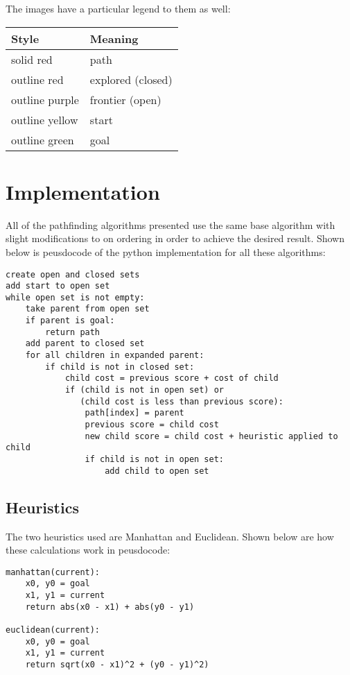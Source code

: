 \documentclass[11pt,letterpaper]{article}
\begin{document}
The images have a particular legend to them as well: \\
\begin{center}
\begin{tabular}{l | l}
Style & Meaning \\ \hline
solid red & path \\
outline red & explored (closed) \\
outline purple & frontier (open) \\
outline yellow & start \\
outline green & goal \\
\end{tabular}
\end{center}

\clearpage

\section{Implementation}
All of the pathfinding algorithms presented use the same base algorithm with slight modifications to on ordering in order to achieve the desired result.
Shown below is peusdocode of the python implementation for all these algorithms:

\begin{verbatim}
create open and closed sets
add start to open set
while open set is not empty:
    take parent from open set
    if parent is goal:
        return path
    add parent to closed set
    for all children in expanded parent:
        if child is not in closed set:
            child cost = previous score + cost of child
            if (child is not in open set) or
               (child cost is less than previous score):
                path[index] = parent
                previous score = child cost
                new child score = child cost + heuristic applied to child
                if child is not in open set:
                    add child to open set
\end{verbatim}

\subsection{Heuristics}

The two heuristics used are Manhattan and Euclidean.
Shown below are how these calculations work in peusdocode:

\begin{verbatim}
manhattan(current):
    x0, y0 = goal
    x1, y1 = current
    return abs(x0 - x1) + abs(y0 - y1)

euclidean(current):
    x0, y0 = goal
    x1, y1 = current
    return sqrt(x0 - x1)^2 + (y0 - y1)^2)
\end{verbatim}
\clearpage
\end{document}
